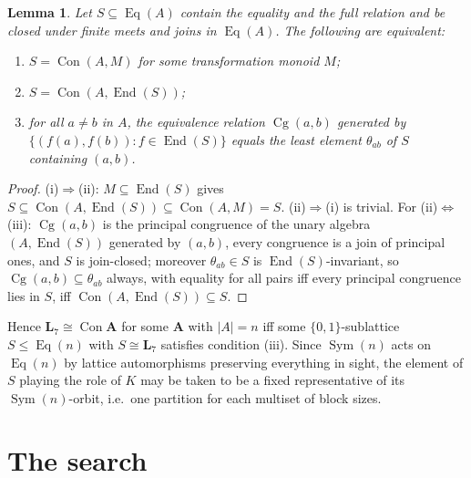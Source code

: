 \documentclass[11pt]{article}
\newtheorem{lemma}[theorem]{Lemma}
\theoremstyle{remark}
\newcommand{\Con}{\operatorname{Con}}
\newcommand{\Eq}{\operatorname{Eq}}
\newcommand{\End}{\operatorname{End}}
\newcommand{\Cg}{\operatorname{Cg}}
\newcommand{\LL}{\mathbf{L}_7}
\begin{document}
\begin{lemma}\label{lem:closure}
Let $S\subseteq\Eq(A)$ contain the equality and the full relation and be closed under
finite meets and joins in $\Eq(A)$. The following are equivalent:
\begin{enumerate}
\item[(i)] $S=\Con(A,M)$ for some transformation monoid $M$;
\item[(ii)] $S=\Con(A,\End(S))$;
\item[(iii)] for all $a\ne b$ in $A$, the equivalence relation $\Cg(a,b)$ generated by
$\{(f(a),f(b)) : f\in\End(S)\}$ equals the least element $\theta_{ab}$ of $S$ containing $(a,b)$.
\end{enumerate}
\end{lemma}
\begin{proof}
(i)$\Rightarrow$(ii): $M\subseteq\End(S)$ gives $S\subseteq\Con(A,\End(S))\subseteq\Con(A,M)=S$.
(ii)$\Rightarrow$(i) is trivial. For (ii)$\Leftrightarrow$(iii): $\Cg(a,b)$ is the principal
congruence of the unary algebra $(A,\End(S))$ generated by $(a,b)$, every congruence is a join
of principal ones, and $S$ is join-closed; moreover $\theta_{ab}\in S$ is $\End(S)$-invariant,
so $\Cg(a,b)\subseteq\theta_{ab}$ always, with equality for all pairs iff every principal
congruence lies in $S$, iff $\Con(A,\End(S))\subseteq S$.
\end{proof}

Hence $\LL\cong\Con\mathbf A$ for some $\mathbf A$ with $|A|=n$ iff some $\{0,1\}$-sublattice
$S\le\Eq(n)$ with $S\cong\LL$ satisfies condition (iii). Since $\operatorname{Sym}(n)$ acts on
$\Eq(n)$ by lattice automorphisms preserving everything in sight, the element of $S$
playing the role of $K$ may be taken to be a fixed representative of its
$\operatorname{Sym}(n)$-orbit, i.e.\ one partition for each multiset of block sizes.

\section{The search}
\end{document}
